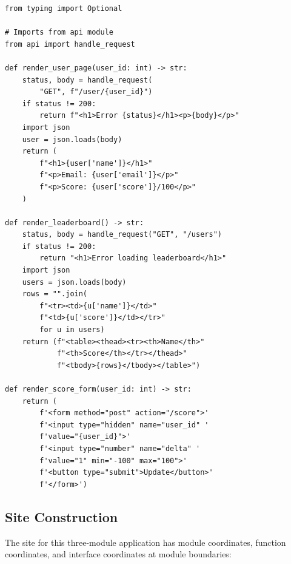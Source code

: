 \documentclass[11pt]{article}
\begin{document}
\begin{lstlisting}[style=jugeo-python,caption={Frontend module (frontend.py).}]
from typing import Optional

# Imports from api module
from api import handle_request

def render_user_page(user_id: int) -> str:
    status, body = handle_request(
        "GET", f"/user/{user_id}")
    if status != 200:
        return f"<h1>Error {status}</h1><p>{body}</p>"
    import json
    user = json.loads(body)
    return (
        f"<h1>{user['name']}</h1>"
        f"<p>Email: {user['email']}</p>"
        f"<p>Score: {user['score']}/100</p>"
    )

def render_leaderboard() -> str:
    status, body = handle_request("GET", "/users")
    if status != 200:
        return "<h1>Error loading leaderboard</h1>"
    import json
    users = json.loads(body)
    rows = "".join(
        f"<tr><td>{u['name']}</td>"
        f"<td>{u['score']}</td></tr>"
        for u in users)
    return (f"<table><thead><tr><th>Name</th>"
            f"<th>Score</th></tr></thead>"
            f"<tbody>{rows}</tbody></table>")

def render_score_form(user_id: int) -> str:
    return (
        f'<form method="post" action="/score">'
        f'<input type="hidden" name="user_id" '
        f'value="{user_id}">'
        f'<input type="number" name="delta" '
        f'value="1" min="-100" max="100">'
        f'<button type="submit">Update</button>'
        f'</form>')
\end{lstlisting}

\subsection{Site Construction}

The \JuGeo{} site for this three-module application has module
coordinates, function coordinates, and interface coordinates at
module boundaries:
\end{document}
